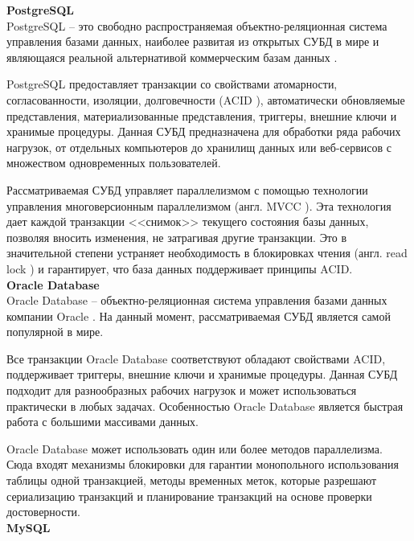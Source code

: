 \noindent\textbf{PostgreSQL}\\

PostgreSQL \cite{postgresql} -- это свободно распространяемая объектно-реляционная система управления базами данных, наиболее развитая из открытых СУБД в мире и являющаяся реальной альтернативой коммерческим базам данных \cite{postgresql-fact}.

PostgreSQL предоставляет транзакции со свойствами атомарности, согласованности, изоляции, долговечности (ACID \cite{acid}), автоматически обновляемые представления, материализованные представления, триггеры, внешние ключи и хранимые процедуры. Данная СУБД предназначена для обработки ряда рабочих нагрузок, от отдельных компьютеров до хранилищ данных или веб-сервисов с множеством одновременных пользователей. 

Рассматриваемая СУБД управляет параллелизмом с помощью технологии управления многоверсионным параллелизмом (англ. MVCC \cite{mvcc}). Эта технология дает каждой транзакции <<снимок>> текущего состояния базы данных, позволяя вносить изменения, не затрагивая другие транзакции. Это в значительной степени устраняет необходимость в блокировках чтения (англ. read lock \cite{r-lock}) и гарантирует, что база данных поддерживает принципы ACID. \\

\noindent\textbf{Oracle Database}\\

Oracle Database \cite{oracle} -- объектно-реляционная система управления базами данных компании Oracle \cite{oracle-company}. На данный момент, рассматриваемая СУБД является самой популярной в мире. \cite{oracle-popular}

Все транзакции Oracle Database соответствуют обладают свойствами ACID, поддерживает триггеры, внешние ключи и хранимые процедуры. Данная СУБД подходит для разнообразных рабочих нагрузок и может использоваться практически в любых задачах. Особенностью Oracle Database является быстрая работа с большими массивами данных.

Oracle Database может использовать один или более методов параллелизма. Сюда входят механизмы блокировки для гарантии монопольного использования таблицы одной транзакцией, методы временных меток, которые разрешают сериализацию транзакций и планирование транзакций на основе проверки достоверности. \\

\noindent\textbf{MySQL}\\

